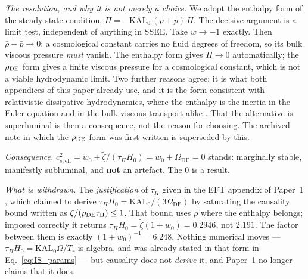 \documentclass[12pt,a4paper]{article}
\newcommand{\KALz}{\mathrm{KAL}_0}
\newcommand{\wz}{w_0}
\newcommand{\OmDE}{\Omega_{\mathrm{DE}}}
\newcommand{\tauPi}{\tau_\Pi}
\newcommand{\ztilde}{\tilde{\zeta}}
\begin{document}
\begin{tcolorbox}[colback=green!4,colframe=green!45!black,
  title={\textbf{Resolved: the normalisation of $\ztilde$ (OP-22, closed 2026-09-06)}}]
\emph{The resolution, and why it is not merely a choice.} We adopt the
enthalpy form of the steady-state condition,
$\Pi = -\KALz\,(\bar\rho+\bar p)\,H$. The decisive argument is a limit test,
independent of anything in SSEE. Take $w \to -1$ exactly. Then
$\bar\rho+\bar p \to 0$: a cosmological constant carries no fluid degrees of
freedom, so its bulk viscous pressure \emph{must} vanish. The enthalpy form
gives $\Pi \to 0$ automatically; the $\rho_{\rm DE}$ form gives a finite
viscous pressure for a cosmological constant, which is not a viable
hydrodynamic limit. Two further reasons agree: it is what both appendices of
this paper already use, and it is the form consistent with relativistic
dissipative hydrodynamics, where the enthalpy is the inertia in the Euler
equation and in the bulk-viscous transport alike
\citep{Maartens1996,HiscockLindblom1985}. That the alternative is superluminal
is then a consequence, not the reason for choosing. The archived note in which
the $\rho_{\rm DE}$ form was first written is superseded by this.

\emph{Consequence.} $c^2_{s,\mathrm{eff}} = \wz + \ztilde/(\tauPi H_0)
= \wz + \OmDE = 0$ stands: marginally stable, manifestly subluminal, and
\textbf{not} an artefact. The $0$ is a result.

\emph{What \emph{is} withdrawn.} The \emph{justification} of $\tauPi$ given in
the EFT appendix of Paper~1 \citep{SSEE_Paper1}, which claimed to derive
$\tauPi H_0 = \KALz/(3\OmDE)$ by saturating the causality bound written as
$\zeta/(\rho_{\rm DE}\tauPi)\le 1$. That bound uses $\rho$ where the enthalpy
belongs; imposed correctly it returns $\tauPi H_0 = \ztilde(1+\wz) = 0.2946$,
not $2.191$. The factor between them is exactly $(1+\wz)^{-1}=6.248$. Nothing
numerical moves --- $\tauPi H_0 = \KALz\Omega/T_r$ is algebra, and was already
stated in that form in Eq.~\eqref{eq:IS_params} --- but causality does not
\emph{derive} it, and Paper~1 no longer claims that it does.


\end{tcolorbox}
\end{document}
